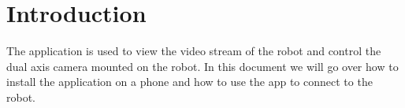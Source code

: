 \section{Introduction}
The application is used to view the video stream of the robot and control the dual axis camera mounted on the robot. In this document we will go over how to install the application on a phone and how to use the app to connect to the robot.
